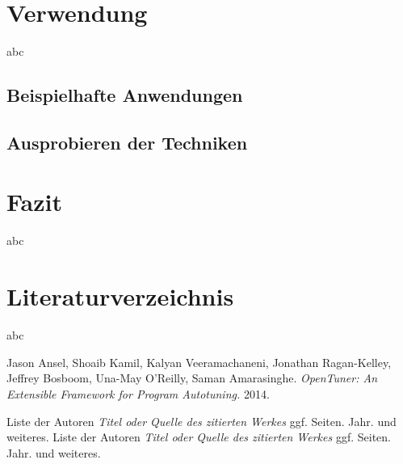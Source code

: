 \documentclass[a4paper,11pt]{scrartcl}
\begin{document}
\section{Verwendung}
abc
\subsection{Beispielhafte Anwendungen}

\subsection{Ausprobieren der Techniken}

\section{Fazit}
abc

\section{Literaturverzeichnis}
abc

\begin{thebibliography}{9}
   
  
     Jason Ansel, Shoaib Kamil, Kalyan Veeramachaneni, Jonathan Ragan-Kelley, Jeffrey Bosboom, Una-May O'Reilly, Saman Amarasinghe. \emph{OpenTuner: An Extensible Framework for Program Autotuning.}
    2014.
   
 Liste der Autoren \emph{Titel oder Quelle des zitierten Werkes} ggf. Seiten.
    Jahr. und weiteres.
 Liste der Autoren \emph{Titel oder Quelle des zitierten Werkes} ggf. Seiten.
    Jahr. und weiteres.

\end{thebibliography}


\end{document}
